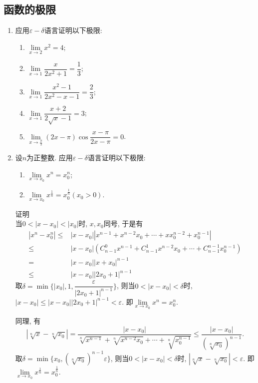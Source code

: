 \documentclass[UTF8,a4paper,20pt]{article}
\begin{document}
\subsection{函数的极限}
\begin{enumerate}[1.]
\item 应用$\varepsilon-\delta$语言证明以下极限:

	\begin{enumerate}[(1)]
	\item $\lim\limits_{x\to2}x^2=4$;
	\item $\lim\limits_{x\to1}\dfrac{x}{2x^2+1}=\dfrac{1}{3}$;
	\item $\lim\limits_{x\to1}\dfrac{x^2-1}{2x^2-x-1}=\dfrac{2}{3}$;
	\item $\lim\limits_{x\to1}\dfrac{x+2}{2\sqrt{x}-1}=3$;
	\item $\lim\limits_{x\to\frac{\pi}{2}}(2x-\pi)\cos\dfrac{x-\pi}{2x-\pi}=0$.
	\end{enumerate}

\item 设$n$为正整数. 应用$\varepsilon-\delta$语言证明以下极限:
	\begin{enumerate}[(1)]
	\item $\lim\limits_{x\to x_0} x^n=x_0^n$;
	\item $\lim\limits_{x\to x_0} x^{\frac{1}{n}}=x_0^{\frac{1}{n}}(x_0>0)$.
	\end{enumerate}
{\heiti 证明}\\
当$0<|x-x_0|<|x_0|$时, $x,x_0$同号, 于是有
	\begin{equation*}
	\begin{split}
	|x^n-x_0^n|\leqslant&|x-x_0||x^{n-1}+x^{n-2}x_0+\cdots+xx_0^{n-2}+x_0^{n-1}|\\
	\leqslant&|x-x_0|(C_{n-1}^0x^{n-1}+C_{n-1}^1x^{n-2}x_0+\cdots+C_{n-1}^{n-1}x_0^{n-1})\\
	=&|x-x_0||x+x_0|^{n-1}\\
	\leqslant&|x-x_0||2x_0+1|^{n-1}
	\end{split}
	\end{equation*}
	取$\delta=\min\{|x_0|,1,\dfrac{\varepsilon}{|2x_0+1|^{n-1}}\}$, 则当$0<|x-x_0|<\delta$时, $|x-x_0|\leqslant|x-x_0||2x_0+1|^{n-1}<\varepsilon$. 即$\lim\limits_{x\to x_0}x^n=x_0^n$.

同理, 有
	\begin{equation*}
	|\sqrt[n]{x}-\sqrt[n]{x_0}|=\dfrac{|x-x_0|}{\sqrt[n]{x^{n-1}}+\sqrt[n]{x^{n-2}x_0}+\cdots+\sqrt[n]{x_0^{n-1}}}\leqslant\dfrac{|x-x_0|}{(\sqrt[n]{x_0})^{n-1}}.
	\end{equation*}
	取$\delta=\min\{x_0,(\sqrt[n]{x_0})^{n-1}\varepsilon\}$, 则当$0<|x-x_0|<\delta$时, $|\sqrt[n]{x}-\sqrt[n]{x_0}|<\varepsilon$. 即$\lim\limits_{x\to x_0} x^{\frac{1}{n}}=x_0^{\frac{1}{n}}$.


\end{enumerate}
\end{document}

